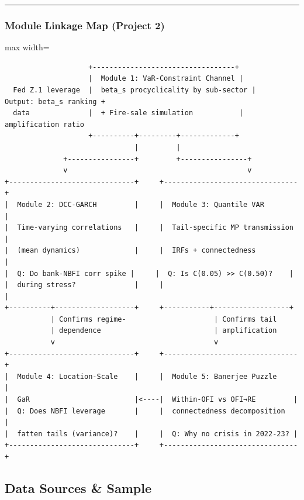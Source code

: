 \documentclass[11pt,a4paper]{article}
\begin{document}
\bigskip\noindent\rule{\textwidth}{0.4pt}\bigskip


\subsubsection{Module Linkage Map (Project 2)}


\begin{adjustbox}{max width=\textwidth}
\begin{minipage}{1.5\textwidth}
\begin{verbatim}
                    +----------------------------------+
                    |  Module 1: VaR-Constraint Channel |
  Fed Z.1 leverage  |  beta_s procyclicality by sub-sector |    Output: beta_s ranking +
  data              |  + Fire-sale simulation           |    amplification ratio
                    +----------+---------+-------------+
                               |         |
              +----------------+         +----------------+
              v                                           v
+------------------------------+     +--------------------------------+
|  Module 2: DCC-GARCH         |     |  Module 3: Quantile VAR        |
|  Time-varying correlations   |     |  Tail-specific MP transmission |
|  (mean dynamics)             |     |  IRFs + connectedness          |
|  Q: Do bank-NBFI corr spike |     |  Q: Is C(0.05) >> C(0.50)?    |
|  during stress?              |     |                                |
+----------+-------------------+     +-----------+------------------+
           | Confirms regime-                     | Confirms tail
           | dependence                           | amplification
           v                                      v
+------------------------------+     +--------------------------------+
|  Module 4: Location-Scale    |     |  Module 5: Banerjee Puzzle     |
|  GaR                         |<----|  Within-OFI vs OFI→RE         |
|  Q: Does NBFI leverage       |     |  connectedness decomposition   |
|  fatten tails (variance)?    |     |  Q: Why no crisis in 2022-23? |
+------------------------------+     +--------------------------------+
\end{verbatim}
\end{minipage}
\end{adjustbox}


\subsection{Data Sources \& Sample}
\end{document}
